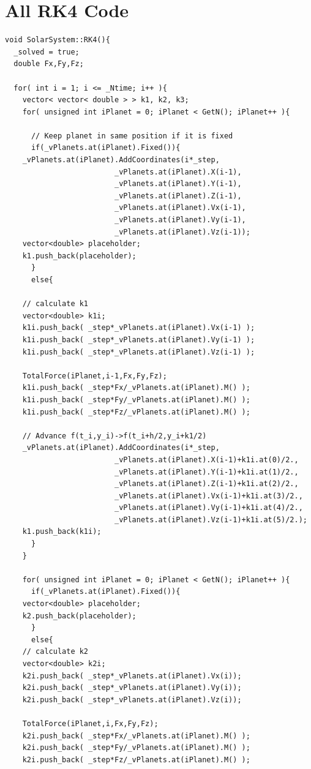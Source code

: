 \documentclass[a4paper,12pt]{report}
\begin{document}
 \chapter{All RK4 Code}\label{app:rk4}
 \singlespacing
 \begin{Verbatim}[fontsize=\small]
void SolarSystem::RK4(){
  _solved = true;
  double Fx,Fy,Fz;

  for( int i = 1; i <= _Ntime; i++ ){
    vector< vector< double > > k1, k2, k3; 
    for( unsigned int iPlanet = 0; iPlanet < GetN(); iPlanet++ ){

      // Keep planet in same position if it is fixed
      if(_vPlanets.at(iPlanet).Fixed()){
	_vPlanets.at(iPlanet).AddCoordinates(i*_step,
					     _vPlanets.at(iPlanet).X(i-1),
					     _vPlanets.at(iPlanet).Y(i-1),
					     _vPlanets.at(iPlanet).Z(i-1),
					     _vPlanets.at(iPlanet).Vx(i-1),
					     _vPlanets.at(iPlanet).Vy(i-1),
					     _vPlanets.at(iPlanet).Vz(i-1));				    
	vector<double> placeholder;
	k1.push_back(placeholder);
      }
      else{

	// calculate k1
	vector<double> k1i;
	k1i.push_back( _step*_vPlanets.at(iPlanet).Vx(i-1) );
	k1i.push_back( _step*_vPlanets.at(iPlanet).Vy(i-1) );
	k1i.push_back( _step*_vPlanets.at(iPlanet).Vz(i-1) );

	TotalForce(iPlanet,i-1,Fx,Fy,Fz);
	k1i.push_back( _step*Fx/_vPlanets.at(iPlanet).M() );
	k1i.push_back( _step*Fy/_vPlanets.at(iPlanet).M() );
	k1i.push_back( _step*Fz/_vPlanets.at(iPlanet).M() );

	// Advance f(t_i,y_i)->f(t_i+h/2,y_i+k1/2)
	_vPlanets.at(iPlanet).AddCoordinates(i*_step,
					     _vPlanets.at(iPlanet).X(i-1)+k1i.at(0)/2.,
					     _vPlanets.at(iPlanet).Y(i-1)+k1i.at(1)/2.,
					     _vPlanets.at(iPlanet).Z(i-1)+k1i.at(2)/2.,
					     _vPlanets.at(iPlanet).Vx(i-1)+k1i.at(3)/2.,
					     _vPlanets.at(iPlanet).Vy(i-1)+k1i.at(4)/2.,
					     _vPlanets.at(iPlanet).Vz(i-1)+k1i.at(5)/2.);
	k1.push_back(k1i);
      }
    }
    
    for( unsigned int iPlanet = 0; iPlanet < GetN(); iPlanet++ ){
      if(_vPlanets.at(iPlanet).Fixed()){
	vector<double> placeholder;
	k2.push_back(placeholder);
      }
      else{
	// calculate k2
	vector<double> k2i;
	k2i.push_back( _step*_vPlanets.at(iPlanet).Vx(i));
	k2i.push_back( _step*_vPlanets.at(iPlanet).Vy(i));
	k2i.push_back( _step*_vPlanets.at(iPlanet).Vz(i));

	TotalForce(iPlanet,i,Fx,Fy,Fz);
	k2i.push_back( _step*Fx/_vPlanets.at(iPlanet).M() );
	k2i.push_back( _step*Fy/_vPlanets.at(iPlanet).M() );
	k2i.push_back( _step*Fz/_vPlanets.at(iPlanet).M() );


\end{Verbatim}
\end{document}
